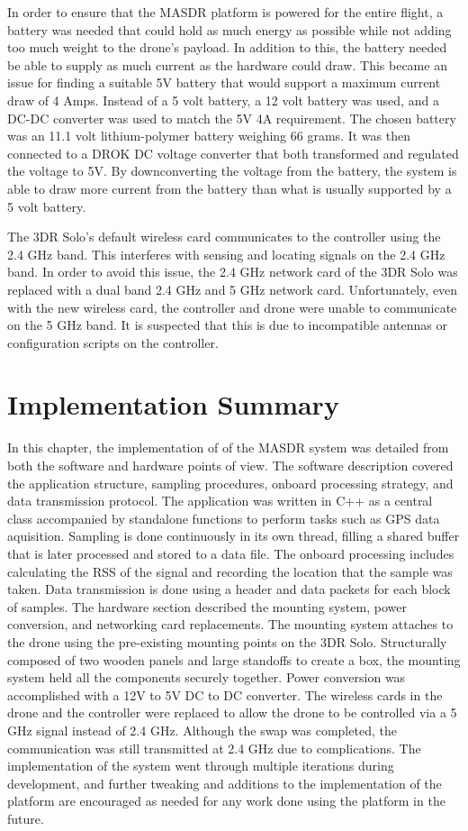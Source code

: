 In order to ensure that the MASDR platform is powered for the entire flight, a battery was needed that could hold as much energy as possible while not adding too much weight to the drone’s payload. In addition to this, the battery needed be able to supply as much current as the hardware could draw. This became an issue for finding a suitable 5V battery that would support a maximum current draw of 4 Amps. Instead of a 5 volt battery, a 12 volt battery was used, and a DC-DC converter was used to match the 5V 4A requirement. The chosen battery was an 11.1 volt lithium-polymer battery weighing 66 grams. It was then connected to a DROK DC voltage converter that both transformed and regulated the voltage to 5V. By downconverting the voltage from the battery, the system is able to draw more current from the battery than what is usually supported by a 5 volt battery. \par
The 3DR Solo’s default wireless card communicates to the controller using the 2.4 GHz band. This interferes with sensing and locating signals on the 2.4 GHz band. In order to avoid this issue, the 2.4 GHz network card of the 3DR Solo was replaced with a dual band 2.4 GHz and 5 GHz network card. Unfortunately, even with the new wireless card, the controller and drone were unable to communicate on the 5 GHz band. It is suspected that this is due to incompatible antennas or configuration scripts on the controller.

\section{Implementation Summary}
In this chapter, the implementation of of the MASDR system was detailed from both the software and hardware points of view. The software description covered the application structure, sampling procedures, onboard processing strategy, and data transmission protocol. The application was written in C++ as a central class accompanied by standalone functions to perform tasks such as GPS data aquisition. Sampling is done continuously in its own thread, filling a shared buffer that is later processed and stored to a data file. The onboard processing includes calculating the RSS of the signal and recording the location that the sample was taken. Data transmission is done using a header and data packets for each block of samples. The hardware section described the mounting system, power conversion, and networking card replacements. The mounting system attaches to the drone using the pre-existing mounting points on the 3DR Solo. Structurally composed of two wooden panels and large standoffs to create a box, the mounting system held all the components securely together. Power conversion was accomplished with a 12V to 5V DC to DC converter. The wireless cards in the drone and the controller were replaced to allow the drone to be controlled via a 5 GHz signal instead of 2.4 GHz. Although the swap was completed, the communication was still transmitted at 2.4 GHz due to complications. The implementation of the system went through multiple iterations during development, and further tweaking and additions to the implementation of the platform are encouraged as needed for any work done using the platform in the future.
